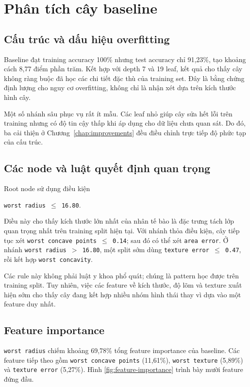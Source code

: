 \chapter{Phân tích cây baseline}
\label{chap:tree-analysis}

\section{Cấu trúc và dấu hiệu overfitting}

Baseline đạt training accuracy 100\% nhưng test accuracy chỉ 91,23\%, tạo
khoảng cách 8,77 điểm phần trăm. Kết hợp với depth 7 và 19 leaf, kết quả cho
thấy cây không ràng buộc đã học các chi tiết đặc thù của training set. Đây là
bằng chứng định lượng cho nguy cơ overfitting, không chỉ là nhận xét dựa trên
kích thước hình cây.

Một số nhánh sâu phục vụ rất ít mẫu. Các leaf nhỏ giúp cây sửa hết lỗi trên
training nhưng có độ tin cậy thấp khi áp dụng cho dữ liệu chưa quan sát. Do đó,
ba cải thiện ở Chương~\ref{chap:improvements} đều điều chỉnh trực tiếp độ phức
tạp của cấu trúc.

\section{Các node và luật quyết định quan trọng}

Root node sử dụng điều kiện
\begin{center}
\texttt{worst radius $\leq$ 16.80}.
\end{center}
Điều này cho thấy kích thước lớn nhất của nhân tế bào là đặc trưng tách lớp
quan trọng nhất trên training split hiện tại. Với nhánh thỏa điều kiện, cây tiếp
tục xét \texttt{worst concave points $\leq$ 0.14}; sau đó có thể xét
\texttt{area error}. Ở nhánh \texttt{worst radius $>$ 16.80}, một split sớm
dùng \texttt{texture error $\leq$ 0.47}, rồi kết hợp \texttt{worst concavity}.

Các rule này không phải luật y khoa phổ quát; chúng là pattern học được trên
training split. Tuy nhiên, việc các feature về kích thước, độ lõm và texture
xuất hiện sớm cho thấy cây đang kết hợp nhiều nhóm hình thái thay vì dựa vào
một feature duy nhất.

\section{Feature importance}

\texttt{worst radius} chiếm khoảng 69,78\% tổng feature importance của
baseline. Các feature tiếp theo gồm \texttt{worst concave points} (11,61\%),
\texttt{worst texture} (5,89\%) và \texttt{texture error} (5,27\%). Hình
\ref{fig:feature-importance} trình bày mười feature đứng đầu.

